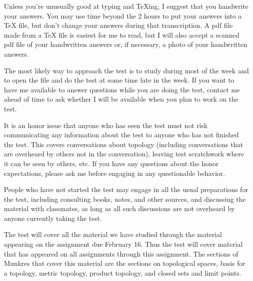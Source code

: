 \documentclass{amsart}
\theoremstyle{plain}
\theoremstyle{definition}
\theoremstyle{remark}
\begin{document}
Unless you're unusually good at typing and TeXing, I suggest that you handwrite your answers. You may use time beyond the 2 hours to put your answers into a TeX file, but don't change your answers during that transcription. A pdf file made from a TeX file is easiest for me to read, but I will also accept a scanned pdf file of your handwritten answers or, if necessary, a photo of your handwritten answers.

The most likely way to approach the test is to study during most of 
the week and to open the file and do the test at some time late in the week.  If you want to have me available to answer questions while you are doing the test, contact me ahead of time to ask whether I will be available when you plan to work on the test. 

It is an honor issue that anyone who has seen the test must not risk 
communicating any information about the test to anyone who has not 
finished the test.  This covers conversations about topology   
(including conversations that are overheard by others not in the 
conversation), leaving test scratchwork where it can be seen by others, etc.  If you have 
any questions about the honor expectations, please ask me before 
engaging in any questionable behavior.  

People who have not started the test may engage in all the usual 
preparations for the test, including consulting books, notes, and 
other sources, and discussing the material with classmates, as long as 
all such discussions are not overheard by anyone currently taking the 
test.

The test will cover all the material we have studied through the 
material appearing on the assignment due February 16.  Thus the test will cover material that has appeared on all assignments through this assignment. The sections of Munkres that cover this material are the sections on topological spaces, basis for a topology, metric topology, product topology, and closed sets and limit points. 


 
\end{document}
